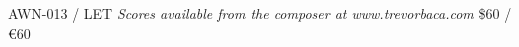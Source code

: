 \documentclass[11pt]{report}
\begin{document}
\null \vfill

AWN-013 / LET \hfill
\textit{Scores available from the composer at www.trevorbaca.com}
\hfill \$60 / \euro 60
\end{document}
